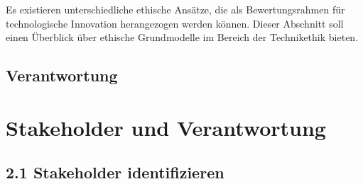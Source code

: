 Es existieren unterschiedliche ethische Ansätze, die als Bewertungsrahmen für technologische Innovation herangezogen werden können. Dieser Abschnitt soll einen Überblick über ethische Grundmodelle im Bereich der Technikethik bieten. 





\subsection{Verantwortung}

\section{Stakeholder und Verantwortung}
\subsection{2.1 Stakeholder identifizieren}
